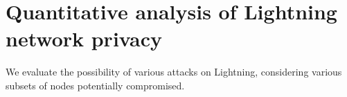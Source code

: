 
\chapter{Quantitative analysis of Lightning network privacy} %

\label{Chapter07_LN_attacks} %

We evaluate the possibility of various attacks on Lightning, considering various subsets of nodes potentially compromised.